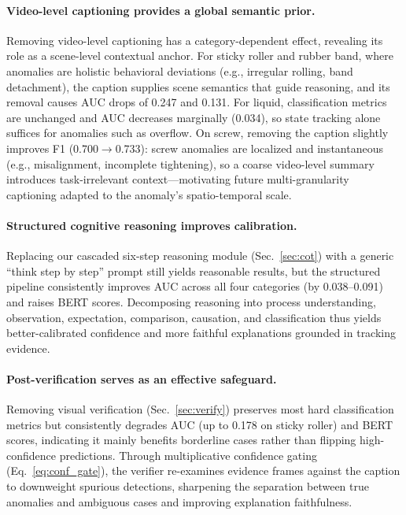 \documentclass[runningheads]{llncs}
\begin{document}
\paragraph{\textbf{Video-level captioning provides a global semantic prior.}}  Removing video-level captioning has a category-dependent effect, revealing its role as a scene-level contextual anchor. For sticky roller and rubber band, where anomalies are holistic behavioral deviations (e.g., irregular rolling, band detachment), the caption supplies scene semantics that guide reasoning, and its removal causes AUC drops of 0.247 and 0.131. For liquid, classification metrics are unchanged and AUC decreases marginally (0.034), so state tracking alone suffices for anomalies such as overflow. On screw, removing the caption slightly improves F1 (0.700$\to$0.733): screw anomalies are localized and instantaneous (e.g., misalignment, incomplete tightening), so a coarse video-level summary introduces task-irrelevant context---motivating future multi-granularity captioning adapted to the anomaly's spatio-temporal scale.

\paragraph{\textbf{Structured cognitive reasoning improves calibration.}} Replacing our cascaded six-step reasoning module (Sec.~\ref{sec:cot}) with a generic ``think step by step'' prompt still yields reasonable results, but the structured pipeline consistently improves AUC across all four categories (by 0.038--0.091) and raises BERT scores. Decomposing reasoning into process understanding, observation, expectation, comparison, causation, and classification thus yields better-calibrated confidence and more faithful explanations grounded in tracking evidence.

\paragraph{\textbf{Post-verification serves as an effective safeguard.}} 
Removing visual verification (Sec.~\ref{sec:verify}) preserves most hard classification metrics but consistently degrades AUC (up to 0.178 on sticky roller) and BERT scores, indicating it mainly benefits borderline cases rather than flipping high-confidence predictions. Through multiplicative confidence gating (Eq.~\ref{eq:conf_gate}), the verifier re-examines evidence frames against the caption to downweight spurious detections, sharpening the separation between true anomalies and ambiguous cases and improving explanation faithfulness.
\end{document}

